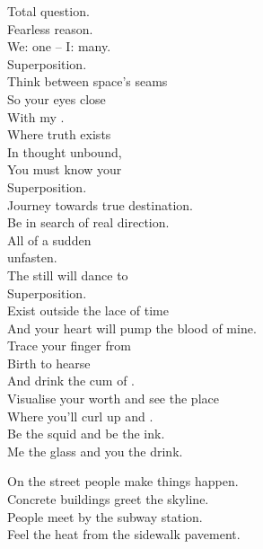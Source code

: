 Total question. \\
Fearless reason. \\
We: one -- I: many. \\
Superposition. \\

Think between space's seams \\
So your eyes close \\
With my . \\
Where truth exists \\
In thought unbound, \\
You must know your \\
Superposition. \\

Journey towards true destination. \\
Be in search of real direction. \\

All of a sudden \\
 unfasten. \\
The still will dance to \\
Superposition. \\

Exist outside the lace of time \\
And your heart will pump the blood of mine. \\
Trace your finger from \\
Birth to hearse \\
And drink the cum of . \\

Visualise your worth and see the place \\
Where you'll curl up and . \\
Be the squid and be the ink. \\
Me the glass and you the drink. \\





On the street people make things happen. \\
Concrete buildings greet the skyline. \\
People meet by the subway station. \\
Feel the heat from the sidewalk pavement. \\

